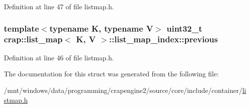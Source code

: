 Definition at line 47 of file listmap.\+h.

\hypertarget{structcrap_1_1list__map_1_1list__map__index_a8e8b7713b93e3733e4663c46e26661ac}{}
\subsubsection[{previous}]{\setlength{\rightskip}{0pt plus 5cm}template$<$typename K, typename V$>$ uint32\+\_\+t {\bf crap\+::list\+\_\+map}$<$ K, V $>$\+::list\+\_\+map\+\_\+index\+::previous}\label{structcrap_1_1list__map_1_1list__map__index_a8e8b7713b93e3733e4663c46e26661ac}


Definition at line 46 of file listmap.\+h.



The documentation for this struct was generated from the following file\+:\begin{DoxyCompactItemize}
\item 
/mnt/windows/data/programming/crapengine2/source/core/include/container/\hyperlink{listmap_8h}{listmap.\+h}\end{DoxyCompactItemize}
